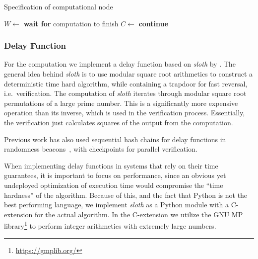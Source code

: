 \begin{algorithm}[tb]
\caption{Specification of computational node}
\label{lst:comp_node}
\begin{algorithmic}[1]
    \State {}
\EndProcedure
{}
    \Repeat
        \State {}
            \State $W \gets $  
                \State {}
                \State {}
                \State {}
                \State \textbf{wait for} computation to finish
                \State $C \gets $ 
                \State {}
            \Else
                \State {}
            \EndIf
        \Else
            \State \textbf{continue}
        \EndIf
\EndProcedure
\end{algorithmic}
\end{algorithm}

\subsubsection{Delay Function}%
\label{ssub:delay_function}
For the computation we implement a delay function based on \textit{sloth} by \citet{randomzoo}.
The general idea behind \textit{sloth} is to use modular square root arithmetics to construct a deterministic time hard algorithm, while containing a trapdoor for fast reversal, i.e.\ verification.
The computation of \textit{sloth} iterates through modular square root permutations of a large prime number.
This is a significantly more expensive operation than its inverse, which is used in the verification process.
Essentially, the verification just calculates squares of the output from the computation.

Previous work has also used sequential hash chains for delay functions in randomness beacons~\cite{bunz2017proofsof}, with checkpoints for parallel verification.

When implementing delay functions in systems that rely on their time guarantees, it is important to focus on performance, since an obvious yet undeployed optimization of execution time would compromise the \enquote{time hardness} of the algorithm.
Because of this, and the fact that Python is not the best performing language, we implement \textit{sloth} as a Python module with a C-extension for the actual algorithm.
In the C-extension we utilize the GNU MP library\footnote{\url{https://gmplib.org/}} to perform integer arithmetics with extremely large numbers.

